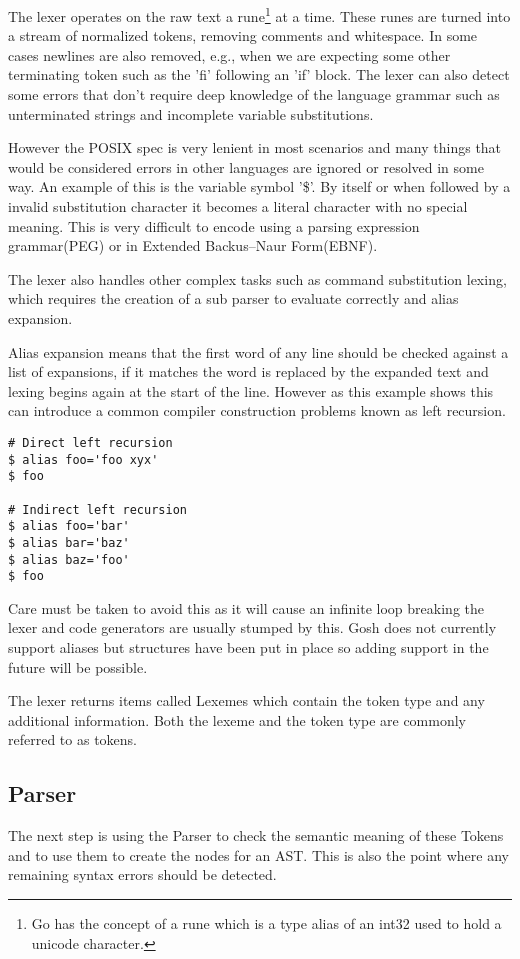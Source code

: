 The lexer operates on the raw text a rune\footnote{Go has the concept of a rune which is a type alias of an int32 used to hold a unicode character.} at a time.
These runes are turned into a stream of normalized tokens, removing comments and whitespace.
In some cases newlines are also removed, e.g., when we are expecting some other terminating token such as the 'fi' following an 'if' block.
The lexer can also detect some errors that don't require deep knowledge of the language grammar such as unterminated strings and incomplete variable substitutions. 

However the POSIX spec is very lenient in most scenarios and many things that would be considered errors in other languages are ignored or resolved in some way.
An example of this is the variable symbol '\$'.
By itself or when followed by a invalid substitution character it becomes a literal character with no special meaning. This is very difficult to encode using a parsing expression grammar(PEG) or in Extended Backus–Naur Form(EBNF).

The lexer also handles other complex tasks such as command substitution lexing, which requires the creation of a sub parser to evaluate correctly and alias expansion.

Alias expansion means that the first word of any line should be checked against a list of expansions, if it matches the word is replaced by the expanded text and lexing begins again at the start of the line.
However as this example shows this can introduce a common compiler construction problems known as left recursion.
\begin{verbatim}
# Direct left recursion
$ alias foo='foo xyx'
$ foo

# Indirect left recursion
$ alias foo='bar'
$ alias bar='baz'
$ alias baz='foo'
$ foo
\end{verbatim}
Care must be taken to avoid this as it will cause an infinite loop breaking the lexer and code generators are usually stumped by this.
Gosh does not currently support aliases but structures have been put in place so adding support in the future will be possible.

The lexer returns items called Lexemes which contain the token type and any additional information.
Both the lexeme and the token type are commonly referred to as tokens.

\subsection{Parser}
The next step is using the Parser to check the semantic meaning of these Tokens and to use them to create the nodes for an AST.
This is also the point where any remaining syntax errors should be detected.


